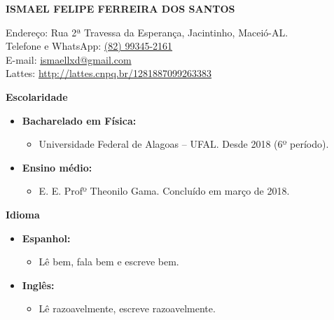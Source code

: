 \documentclass[
   12pt,                         %
   a4paper,                      %
   spanish,                      %
   brazil,                       %
   xcolor=table                  %
]{abntex2}
\begin{document}
   \begin{center}
      \textbf{ISMAEL FELIPE FERREIRA DOS SANTOS}
   \end{center}
   \begin{flushleft}
      \small
      Endereço: Rua 2ª Travessa da Esperança, Jacintinho, Maceió-AL.\\
      Telefone e WhatsApp: \href{tel:+5582993452161}{(82) 99345-2161}\\
      E-mail: \href{mailto:ismaellxd@gmail.com}{ismaellxd@gmail.com}\\
      Lattes: \href{http://lattes.cnpq.br/1281887099263383}{http://lattes.cnpq.br/1281887099263383}
   \end{flushleft}

   \begin{flushleft}
      \hline \vspace{2pt}
      \textbf{Escolaridade} \vspace{2pt} \hline
   \end{flushleft}
   \begin{itemize}[nosep]
      \item[ ] \textbf{Bacharelado em Física:}
      \begin{itemize}[nosep]
        \item[ ] Universidade Federal de Alagoas – UFAL. Desde 2018 (6º período).
      \end{itemize}
      \item[ ] \textbf{Ensino médio:}
      \begin{itemize}[nosep]
        \item[ ] E. E. Profº Theonilo Gama. Concluído em março de 2018.
      \end{itemize}
   \end{itemize}

   \begin{flushleft}
      \hline \vspace{2pt}
      \textbf{Idioma} \vspace{2pt} \hline
   \end{flushleft}
   \begin{itemize}[nosep]
      \item[ ] \textbf{Espanhol:}
      \begin{itemize}[nosep]
        \item[ ] Lê bem, fala bem e escreve bem.
      \end{itemize}
      \item[ ] \textbf{Inglês:}
      \begin{itemize}[nosep]
        \item[ ] Lê razoavelmente, escreve razoavelmente.
      \end{itemize}
   \end{itemize}
\end{document}

